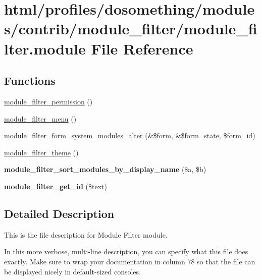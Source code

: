 \hypertarget{module__filter_8module}{
\section{html/profiles/dosomething/modules/contrib/module\_\-filter/module\_\-filter.module File Reference}
\label{module__filter_8module}
}
\subsection*{Functions}
\begin{DoxyCompactItemize}
\item 
\hyperlink{module__filter_8module_a56a363584cb3cf1fb9e77576ff2084e1}{module\_\-filter\_\-permission} ()
\item 
\hyperlink{module__filter_8module_a050928e7cb73c7a13c98238938fd4870}{module\_\-filter\_\-menu} ()
\item 
\hyperlink{module__filter_8module_aac9264bd5392b27f02a2d1c8f9e01ab4}{module\_\-filter\_\-form\_\-system\_\-modules\_\-alter} (\&\$form, \&\$form\_\-state, \$form\_\-id)
\item 
\hyperlink{module__filter_8module_a100b5ac9f4415c026e19b3a79198d5ae}{module\_\-filter\_\-theme} ()
\item 
\hypertarget{module__filter_8module_a3c759bb00bd8b3165aeb1ca8eb05db3f}{
{\bfseries module\_\-filter\_\-sort\_\-modules\_\-by\_\-display\_\-name} (\$a, \$b)}
\label{module__filter_8module_a3c759bb00bd8b3165aeb1ca8eb05db3f}

\item 
\hypertarget{module__filter_8module_a284e1007c0c284808b6cd1e5a1a7cb9c}{
{\bfseries module\_\-filter\_\-get\_\-id} (\$text)}
\label{module__filter_8module_a284e1007c0c284808b6cd1e5a1a7cb9c}

\end{DoxyCompactItemize}


\subsection{Detailed Description}
This is the file description for Module Filter module.

In this more verbose, multi-\/line description, you can specify what this file does exactly. Make sure to wrap your documentation in column 78 so that the file can be displayed nicely in default-\/sized consoles.

